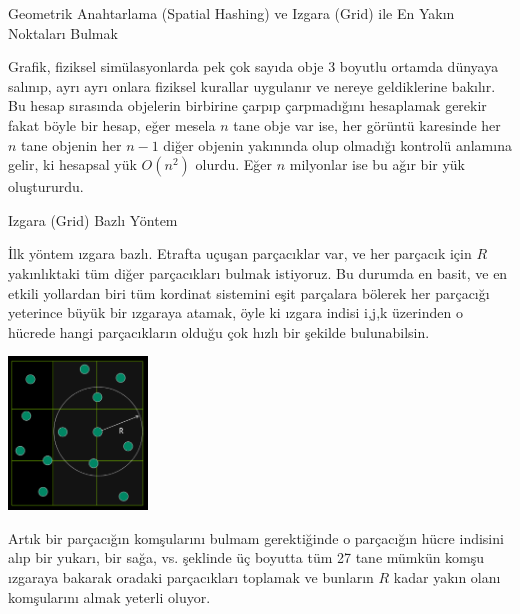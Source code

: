 \documentclass[12pt,fleqn]{article}\usepackage{../../common}
\begin{document}
Geometrik Anahtarlama (Spatial Hashing) ve Izgara (Grid) ile En Yakın Noktaları Bulmak

Grafik, fiziksel simülasyonlarda pek çok sayıda obje 3 boyutlu ortamda dünyaya
salınıp, ayrı ayrı onlara fiziksel kurallar uygulanır ve nereye geldiklerine
bakılır. Bu hesap sırasında objelerin birbirine çarpıp çarpmadığını hesaplamak
gerekir fakat böyle bir hesap, eğer mesela $n$ tane obje var ise, her görüntü
karesinde her $n$ tane objenin her $n-1$ diğer objenin yakınında olup olmadığı
kontrolü anlamına gelir, ki hesapsal yük $O(n^2)$ olurdu. Eğer $n$ milyonlar ise
bu ağır bir yük oluştururdu.

Izgara (Grid) Bazlı Yöntem

İlk yöntem ızgara bazlı. Etrafta uçuşan parçacıklar var, ve her parçacık için
$R$ yakınlıktaki tüm diğer parçacıkları bulmak istiyoruz. Bu durumda en basit,
ve en etkili yollardan biri tüm kordinat sistemini eşit parçalara bölerek her
parçacığı yeterince büyük bir ızgaraya atamak, öyle ki ızgara indisi i,j,k
üzerinden o hücrede hangi parçacıkların olduğu çok hızlı bir şekilde
bulunabilsin.  

\includegraphics[width=10em]{algs_073_hash_03.png}

Artık bir parçacığın komşularını bulmam gerektiğinde o parçacığın hücre indisini
alıp bir yukarı, bir sağa, vs. şeklinde üç boyutta tüm 27 tane mümkün komşu
ızgaraya bakarak oradaki parçacıkları toplamak ve bunların $R$ kadar yakın olanı
komşularını almak yeterli oluyor.
\end{document}

